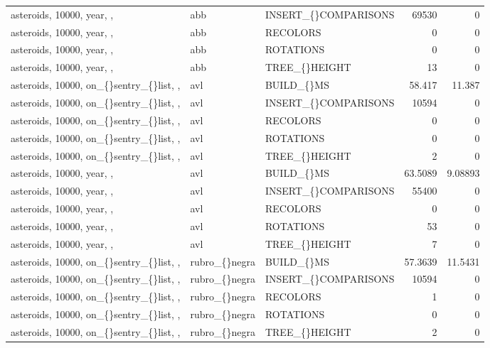 \begin{longtable}{p{4cm}p{1.4cm}p{2.6cm}rr}
asteroids, 10000, year, ,  & abb & INSERT\_\allowbreak\{\}COMPARISONS & 69530 & 0\\
asteroids, 10000, year, ,  & abb & RECOLORS & 0 & 0\\
asteroids, 10000, year, ,  & abb & ROTATIONS & 0 & 0\\
asteroids, 10000, year, ,  & abb & TREE\_\allowbreak\{\}HEIGHT & 13 & 0\\
asteroids, 10000, on\_\allowbreak\{\}sentry\_\allowbreak\{\}list, ,  & avl & BUILD\_\allowbreak\{\}MS & 58.417 & 11.387\\
asteroids, 10000, on\_\allowbreak\{\}sentry\_\allowbreak\{\}list, ,  & avl & INSERT\_\allowbreak\{\}COMPARISONS & 10594 & 0\\
asteroids, 10000, on\_\allowbreak\{\}sentry\_\allowbreak\{\}list, ,  & avl & RECOLORS & 0 & 0\\
asteroids, 10000, on\_\allowbreak\{\}sentry\_\allowbreak\{\}list, ,  & avl & ROTATIONS & 0 & 0\\
asteroids, 10000, on\_\allowbreak\{\}sentry\_\allowbreak\{\}list, ,  & avl & TREE\_\allowbreak\{\}HEIGHT & 2 & 0\\
asteroids, 10000, year, ,  & avl & BUILD\_\allowbreak\{\}MS & 63.5089 & 9.08893\\
asteroids, 10000, year, ,  & avl & INSERT\_\allowbreak\{\}COMPARISONS & 55400 & 0\\
asteroids, 10000, year, ,  & avl & RECOLORS & 0 & 0\\
asteroids, 10000, year, ,  & avl & ROTATIONS & 53 & 0\\
asteroids, 10000, year, ,  & avl & TREE\_\allowbreak\{\}HEIGHT & 7 & 0\\
asteroids, 10000, on\_\allowbreak\{\}sentry\_\allowbreak\{\}list, ,  & rubro\_\allowbreak\{\}negra & BUILD\_\allowbreak\{\}MS & 57.3639 & 11.5431\\
asteroids, 10000, on\_\allowbreak\{\}sentry\_\allowbreak\{\}list, ,  & rubro\_\allowbreak\{\}negra & INSERT\_\allowbreak\{\}COMPARISONS & 10594 & 0\\
asteroids, 10000, on\_\allowbreak\{\}sentry\_\allowbreak\{\}list, ,  & rubro\_\allowbreak\{\}negra & RECOLORS & 1 & 0\\
asteroids, 10000, on\_\allowbreak\{\}sentry\_\allowbreak\{\}list, ,  & rubro\_\allowbreak\{\}negra & ROTATIONS & 0 & 0\\
asteroids, 10000, on\_\allowbreak\{\}sentry\_\allowbreak\{\}list, ,  & rubro\_\allowbreak\{\}negra & TREE\_\allowbreak\{\}HEIGHT & 2 & 0\\

\end{longtable}
